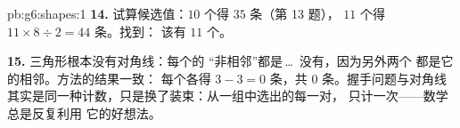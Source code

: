 \begin{solution}{pb:g6:shapes:1}
\textbf{14.} 试算候选值：$10$ 个得 $35$ 条（第 13 题），
$11$ 个得 $11 \times 8 \div 2 = 44$ 条。找到：
该有 $11$ 个。

\textbf{15.} 三角形根本没有对角线：每个的
“非相邻”都是\,\dots\ 没有，因为另外两个
都是它的相邻。方法的结果一致：
每个各得 $3 - 3 = 0$ 条，共 $0$ 条。握手问题与对角线
其实是同一种计数，只是换了装束：从一组中选出的每一对，
只计一次——数学总是反复利用
它的好想法。
\end{solution}

